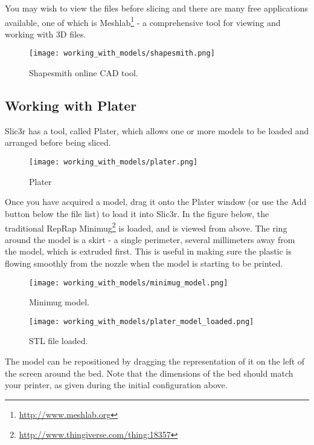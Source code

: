 You may wish to view the files before slicing and there are many free applications available, one of which is Meshlab\footnote{\url{http://www.meshlab.org}} - a comprehensive tool for viewing and working with 3D files.

\begin{figure}[H]
\centering
\texttt{[image: working\_with\_models/shapesmith.png]}
\caption{Shapesmith online CAD tool.}
\label{fig:shapesmith}
\end{figure}



\subsection{Working with Plater} %
\label{sub:working_with_plater}
Slic3r has a tool, called Plater, which allows one or more models to be loaded and arranged before being sliced.

\begin{figure}[H]
\centering
\texttt{[image: working\_with\_models/plater.png]}
\caption{Plater}
\label{fig:plater}
\end{figure}

Once you have acquired a model, drag it onto the Plater window (or use the Add button below the file list) to load it into Slic3r.  In the figure below, the traditional RepRap Minimug\footnote{\url{http://www.thingiverse.com/thing:18357}} is loaded, and is viewed from above. The ring around the model is a skirt - a single perimeter, several millimeters away from the model, which is extruded first.  This is useful in making sure the plastic is flowing smoothly from the nozzle when the model is starting to be printed.

\begin{figure}[H]
\centering
\texttt{[image: working\_with\_models/minimug\_model.png]}
\caption{Minimug model.}
\label{fig:minimug_model}
\end{figure}

\begin{figure}[H]
\centering
\texttt{[image: working\_with\_models/plater\_model\_loaded.png]}
\caption{STL file loaded.}
\label{fig:plater_model_loaded}
\end{figure}

The model can be repositioned by dragging the representation of it on the left of the screen around the bed.  Note that the dimensions of the bed should match your printer, as given during the initial configuration above.

